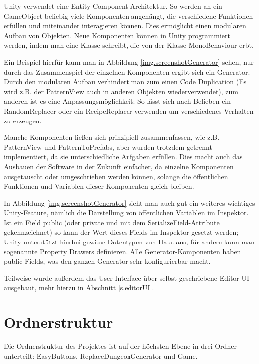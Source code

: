 Unity verwendet eine Entity-Component-Architektur. So werden an ein GameObject beliebig viele Komponenten angehängt, die verschiedene Funktionen erfüllen und miteinander interagieren können. Dies ermöglicht einen modularen Aufbau von Objekten. 
\cite[Seite: GameObjects]{unityManual}
Neue Komponenten können in Unity programmiert werden, indem man eine Klasse schreibt, die von der Klasse MonoBehaviour erbt.
\cite[Seite: CreatingAndUsingScripts]{unityManual}

Ein Beispiel hierfür kann man in Abbildung \ref{img.screenshotGenerator} sehen, nur durch das Zusammenspiel der einzelnen Komponenten ergibt sich ein Generator. Durch den modularen Aufbau verhindert man zum einen Code Duplication (Es wird z.B. der PatternView auch in anderen Objekten wiederverwendet), zum anderen ist es eine Anpassungsmöglichkeit: So lässt sich nach Belieben ein RandomReplacer oder ein RecipeReplacer verwenden um verschiedenes Verhalten zu erzeugen. 

Manche Komponenten ließen sich prinzipiell zusammenfassen, wie z.B. PatternView und PatternToPrefabs, aber wurden trotzdem getrennt implementiert, da sie unterschiedliche Aufgaben erfüllen. Dies macht auch das Ausbauen der Software in der Zukunft einfacher, da einzelne Komponenten ausgetauscht oder umgeschrieben werden können, solange die öffentlichen Funktionen und Variablen dieser Komponenten gleich bleiben.

In Abbildung \ref{img.screenshotGenerator} sieht man auch gut ein weiteres wichtiges Unity-Feature, nämlich die Darstellung von öffentlichen Variablen im Inspektor. Ist ein Field public (oder private und mit dem SerializeField-Attribute gekennzeichnet) so kann der Wert dieses Fields im Inspektor gesetzt werden; Unity unterstützt hierbei gewisse Datentypen von Haus aus, für andere kann man sogenannte Property Drawers definieren. Alle Generator-Komponenten haben public Fields, was den ganzen Generator sehr konfigurierbar macht.

Teilweise wurde außerdem das User Interface über selbst geschriebene Editor-UI ausgebaut, mehr hierzu in Abschnitt \ref{s.editorUI}.

\section{Ordnerstruktur}


Die Ordnerstruktur des Projektes ist auf der höchsten Ebene in drei Ordner unterteilt: EasyButtons, ReplaceDungeonGenerator und Game.


